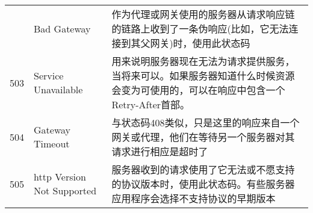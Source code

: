 \begin{longtable}[]{@{}cll@{}}
\begin{minipage}[t]{0.32\columnwidth}
\end{minipage} & \begin{minipage}[t]{0.30\columnwidth}\raggedright\strut
Bad Gateway\strut
\end{minipage} & \begin{minipage}[t]{0.30\columnwidth}\raggedright\strut
作为代理或网关使用的服务器从请求响应链的链路上收到了一条伪响应(比如，它无法连接到其父网关)时，使用此状态码\strut
\end{minipage}\tabularnewline
\begin{minipage}[t]{0.32\columnwidth}\centering\strut
503\strut
\end{minipage} & \begin{minipage}[t]{0.30\columnwidth}\raggedright\strut
Service Unavailable\strut
\end{minipage} & \begin{minipage}[t]{0.30\columnwidth}\raggedright\strut
用来说明服务器现在无法为请求提供服务，当将来可以。如果服务器知道什么时候资源会变为可使用的，可以在响应中包含一个Retry-After首部。\strut
\end{minipage}\tabularnewline
\begin{minipage}[t]{0.32\columnwidth}\centering\strut
504\strut
\end{minipage} & \begin{minipage}[t]{0.30\columnwidth}\raggedright\strut
Gateway Timeout\strut
\end{minipage} & \begin{minipage}[t]{0.30\columnwidth}\raggedright\strut
与状态码408类似，只是这里的响应来自一个网关或代理，他们在等待另一个服务器对其请求进行相应是超时了\strut
\end{minipage}\tabularnewline
\begin{minipage}[t]{0.32\columnwidth}\centering\strut
505\strut
\end{minipage} & \begin{minipage}[t]{0.30\columnwidth}\raggedright\strut
http Version Not Supported\strut
\end{minipage} & \begin{minipage}[t]{0.30\columnwidth}\raggedright\strut
服务器收到的请求使用了它无法或不愿支持的协议版本时，使用此状态码。有些服务器应用程序会选择不支持协议的早期版本\strut
\end{minipage}\tabularnewline
\bottomrule
\end{longtable}
